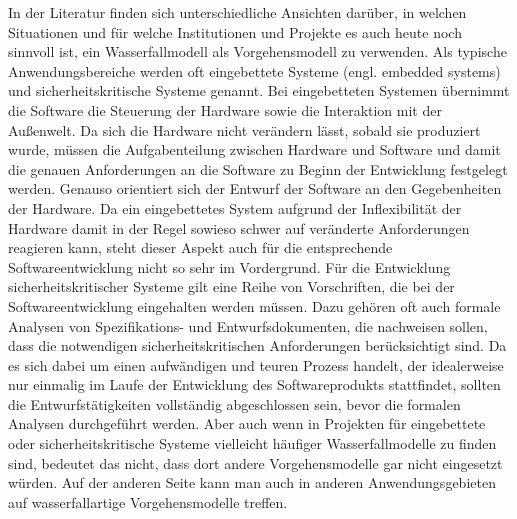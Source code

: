 In  der Literatur finden sich unterschiedliche Ansichten darüber, in welchen Situationen und für welche Institutionen und Projekte es auch heute noch sinnvoll ist, ein Wasserfallmodell als Vorgehensmodell zu verwenden. Als typische
Anwendungs\-bereiche werden oft eingebettete Systeme (engl. embedded systems) und sicherheitskritische Systeme genannt. Bei eingebetteten Systemen übernimmt die Software die Steuerung der Hardware sowie die Interaktion mit der Außenwelt. Da sich die Hardware nicht verändern lässt, sobald sie produziert wurde, müssen die Aufgaben\-teilung zwischen Hardware und Software und damit die genauen Anforderungen an die Software zu Beginn der Entwicklung festgelegt werden. Genauso orientiert sich der Entwurf der Software an den Gegebenheiten der Hardware. Da ein eingebettetes System aufgrund der Inflexibilität der Hardware damit in der Regel sowieso schwer auf veränderte Anforderungen reagieren kann, steht dieser Aspekt auch für die entsprechende Softwareentwicklung nicht so sehr im Vordergrund. Für die Entwicklung sicherheitskritischer Systeme gilt eine Reihe von Vorschriften, die bei der Softwareentwicklung eingehalten werden müssen. Dazu gehören oft auch formale Analysen von Spezifikations- und Entwurfsdokumenten, die nachweisen sollen, dass die notwendigen sicherheitskritischen Anforderungen berücksichtigt sind. Da es sich dabei um einen aufwändigen und teuren Prozess handelt, der idealerweise nur einmalig im Laufe der Entwicklung des Softwareprodukts stattfindet, sollten die Entwurfs\-tätig\-keiten vollständig abgeschlossen sein, bevor die formalen Analysen durchgeführt werden. Aber auch wenn in Projekten für eingebettete oder sicherheitskritische Systeme vielleicht häufiger Wasserfallmodelle zu finden sind, bedeutet das nicht, dass dort andere Vorgehensmodelle gar nicht eingesetzt würden. Auf der anderen Seite kann man auch in anderen Anwendungsgebieten auf wasserfallartige Vorgehensmodelle treffen.

